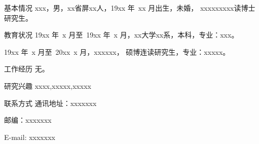 \begin{resume}

\begin{resumesection}{基本情况}
xxx，男，xx省屏xx人，19xx 年~xx 月出生，未婚，
xxxxxxxxx读博士研究生。
\end{resumesection}

\begin{resumelist}{教育状况}
19xx 年~x 月至~19xx 年~x 月，xx大学xx系，本科，专业：xxx。

19xx 年~x 月至~20xx~x 月，xxxxxx，
硕博连读研究生，专业：xxxxx。
\end{resumelist}

\begin{resumelist}{工作经历}
无。
\end{resumelist}

\begin{resumelist}{研究兴趣}
    xxxx,xxxxx,xxxxx
\end{resumelist}

\begin{resumelist}{联系方式}
通讯地址：xxxxxxx

邮编：xxxxxxx

E-mail: xxxxxxx
\end{resumelist}

\end{resume}
